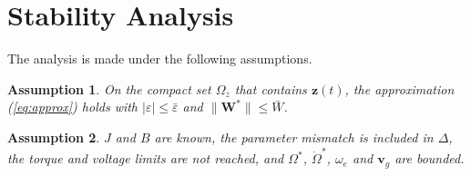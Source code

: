 \documentclass[11pt,a4paper]{article}
\newtheorem{assumption}{Assumption}
\newcommand{\bv}[1]{\mathbf{#1}}
\begin{document}
\section{Stability Analysis}
The analysis is made under the following assumptions.
\begin{assumption}
On the compact set $\Omega_z$ that contains $\bv{z}(t)$, the approximation (\ref{eq:approx}) holds with
$|\varepsilon|\le\bar\varepsilon$ and $\|\bv{W}^*\|\le\bar W$.
\end{assumption}
\begin{assumption}
$J$ and $B$ are known, the parameter mismatch is included in $\Delta$, the torque and voltage limits are
not reached, and $\Omega^*$, $\dot\Omega^*$, $\omega_e$ and $\bv{v}_g$ are bounded.
\end{assumption}
\end{document}
